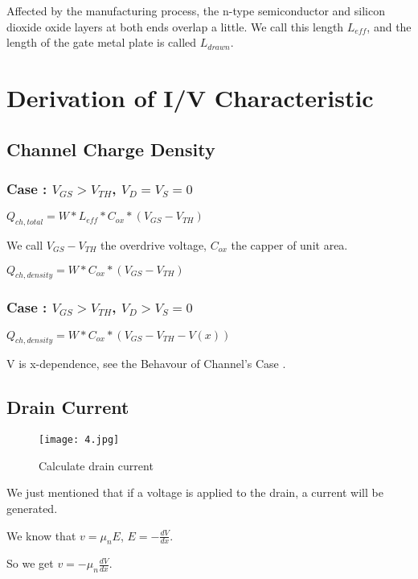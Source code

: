 \documentclass[fontset=windows]{article}
\begin{document}
Affected by the manufacturing process, the n-type semiconductor and silicon dioxide oxide layers at both ends overlap a little.
We call this length $L_{eff}$, and the length of the gate metal plate is called $L_{drawn}$.

\section*{Derivation of I/V Characteristic}

\subsection*{Channel Charge Density}

\subsubsection*{Case \uppercase\expandafter{}: $V_{GS}>V_{TH}$, $V_D=V_S=0$}

$Q_{ch,total}=W*L_{eff}*C_{ox}*(V_{GS}-V_{TH})$

We call $V_{GS}-V_{TH}$ the overdrive voltage, $C_{ox}$ the capper of unit area.

$Q_{ch,density}=W*C_{ox}*(V_{GS}-V_{TH})$

\subsubsection*{Case \uppercase\expandafter{}: $V_{GS}>V_{TH}$, $V_D>V_S=0$}

$Q_{ch,density}=W*C_{ox}*(V_{GS}-V_{TH}-V(x))$

V is x-dependence, see the Behavour of Channel's Case \uppercase\expandafter{}.

\subsection*{Drain Current}

\begin{figure}[htbp]
    \centering
    \texttt{[image: 4.jpg]}
    \captionsetup{labelformat=empty}
    \caption{Calculate drain current}
    \label{4}
\end{figure}

We just mentioned that if a voltage is applied to the drain, a current will be generated.

We know that $v=\mu_{n}E$, $E=-\frac{dV}{dx}$.

So we get $v=-\mu_{n}\frac{dV}{dx}$.
\end{document}
